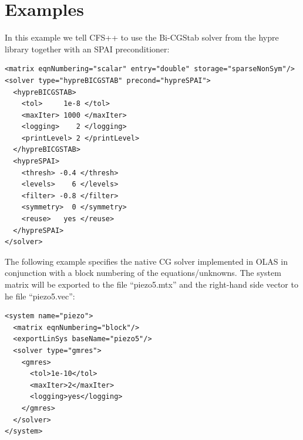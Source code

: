 %
%

\section{Examples}
\label{sec:SP_Examples}
%
%
In this example we tell CFS++ to use the Bi-CGStab solver from the hypre
library together with an SPAI preconditioner:
%
%
\begin{verbatim}
<matrix eqnNumbering="scalar" entry="double" storage="sparseNonSym"/>
<solver type="hypreBICGSTAB" precond="hypreSPAI">
  <hypreBICGSTAB>
    <tol>     1e-8 </tol>
    <maxIter> 1000 </maxIter>
    <logging>    2 </logging>
    <printLevel> 2 </printLevel>
  </hypreBICGSTAB>
  <hypreSPAI>
    <thresh> -0.4 </thresh>
    <levels>    6 </levels>
    <filter> -0.8 </filter>
    <symmetry>  0 </symmetry>
    <reuse>   yes </reuse>
  </hypreSPAI>
</solver>
\end{verbatim}
%
%
The following example specifies the native CG solver implemented in OLAS in
conjunction with a block numbering of the equations/unknowns. The system matrix
will be exported to the file ``piezo5.mtx'' and the right-hand side vector to 
he file ``piezo5.vec'':
\begin{verbatim}
<system name="piezo">
  <matrix eqnNumbering="block"/>
  <exportLinSys baseName="piezo5"/>
  <solver type="gmres">
    <gmres>
      <tol>1e-10</tol>
      <maxIter>2</maxIter>
      <logging>yes</logging>
    </gmres>
  </solver>
</system>
\end{verbatim}

